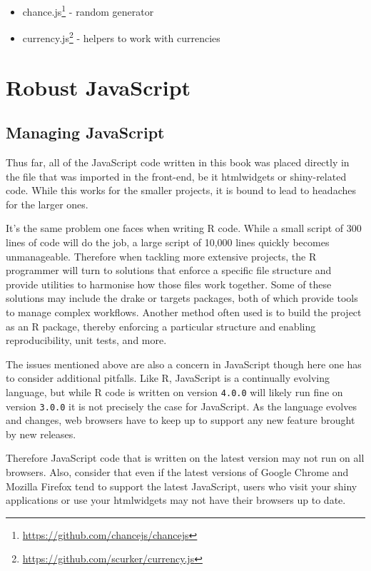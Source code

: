 \documentclass[
  10pt,
]{krantz}
\providecommand{\tightlist}{%
  \setlength{\itemsep}{0pt}\setlength{\parskip}{0pt}}
\renewcommand{\href}[2]{#2\footnote{\url{#1}}}
\begin{document}
\begin{itemize}
\tightlist
\item
  \href{https://github.com/chancejs/chancejs}{chance.js} - random generator
\item
  \href{https://github.com/scurker/currency.js}{currency.js} - helpers to work with currencies
\end{itemize}

\hypertarget{part-robust-javascript}{%
\part{Robust JavaScript}\label{part-robust-javascript}}

\hypertarget{webpack-intro}{%
\chapter{Managing JavaScript}\label{webpack-intro}}

Thus far, all of the JavaScript code written in this book was placed directly in the file that was imported in the front-end, be it htmlwidgets or shiny-related code. While this works for the smaller projects, it is bound to lead to headaches for the larger ones.

It's the same problem one faces when writing R code. While a small script of 300 lines of code will do the job, a large script of 10,000 lines quickly becomes unmanageable. Therefore when tackling more extensive projects, the R programmer will turn to solutions that enforce a specific file structure and provide utilities to harmonise how those files work together. Some of these solutions may include the drake \citep{R-drake} or targets \citep{R-targets} packages, both of which provide tools to manage complex workflows. Another method often used is to build the project as an R package, thereby enforcing a particular structure and enabling reproducibility, unit tests, and more.

The issues mentioned above are also a concern in JavaScript though here one has to consider additional pitfalls. Like R, JavaScript is a continually evolving language, but while R code is written on version \texttt{4.0.0} will likely run fine on version \texttt{3.0.0} it is not precisely the case for JavaScript. As the language evolves and changes, web browsers have to keep up to support any new feature brought by new releases.

Therefore JavaScript code that is written on the latest version may not run on all browsers. Also, consider that even if the latest versions of Google Chrome and Mozilla Firefox tend to support the latest JavaScript, users who visit your shiny applications or use your htmlwidgets may not have their browsers up to date.
\end{document}
